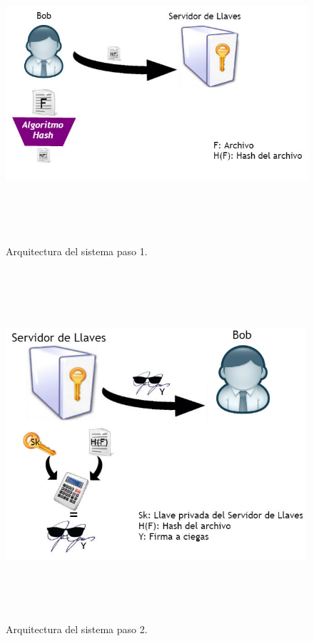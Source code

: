 \begin{figure}[H]
\centering
	\includegraphics[width=16cm, height=11cm]{./images/Paso01.jpg}
	\caption{Arquitectura del sistema paso 1.}

\end{figure}

\begin{figure}[H]
\centering
	\includegraphics[width=16cm, height=13cm]{./images/Paso02.jpg}
	\caption{Arquitectura del sistema paso 2.}

\end{figure}

